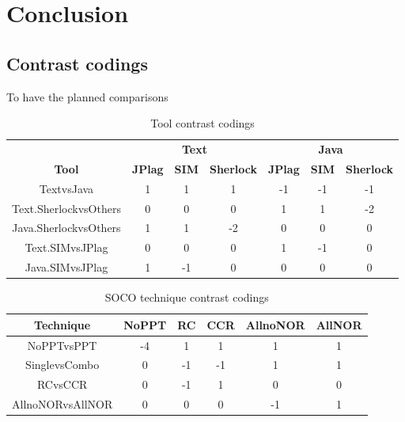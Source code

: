 \documentclass[a4paper, 12pt, oneside, openany, final, pdftex]{book}\usepackage[]{graphicx}\usepackage[]{color}
\begin{document}
\chapter{Conclusion}\label{ch:conclusion}


\begin{appendices}
  \chapter{Contrast codings}\label{apx:contrasts}

  

To have the planned comparisons 

\begin{table}[ht]
  \centering
  \caption{Tool contrast codings}\label{tbl:socoToolContrastsCodings}

\begin{tabular}{ccccccc}
\toprule
\multicolumn{1}{c}{\textbf{ }} & \multicolumn{3}{c}{\textbf{Text}} & \multicolumn{3}{c}{\textbf{Java}} \\
\cmidrule(l{3pt}r{3pt}){2-4} \cmidrule(l{3pt}r{3pt}){5-7}
\multicolumn{1}{c}{\textbf{Tool}} & \multicolumn{1}{c}{\textbf{JPlag}} & \multicolumn{1}{c}{\textbf{SIM}} & \multicolumn{1}{c}{\textbf{Sherlock}} & \multicolumn{1}{c}{\textbf{JPlag}} & \multicolumn{1}{c}{\textbf{SIM}} & \multicolumn{1}{c}{\textbf{Sherlock}}\\
\midrule
\rowcolor{gray!6}  TextvsJava & 1 & 1 & 1 & -1 & -1 & -1\\
Text.SherlockvsOthers & 0 & 0 & 0 & 1 & 1 & -2\\
\rowcolor{gray!6}  Java.SherlockvsOthers & 1 & 1 & -2 & 0 & 0 & 0\\
Text.SIMvsJPlag & 0 & 0 & 0 & 1 & -1 & 0\\
\rowcolor{gray!6}  Java.SIMvsJPlag & 1 & -1 & 0 & 0 & 0 & 0\\
\bottomrule
\end{tabular}


\end{table}

\begin{table}[ht]
  \centering
  \caption{SOCO technique contrast codings}\label{tbl:socotechniqueContrastsCodings}

\begin{tabular}{cccccc}
\toprule
\multicolumn{1}{c}{\textbf{Technique}} & \multicolumn{1}{c}{\textbf{NoPPT}} & \multicolumn{1}{c}{\textbf{RC}} & \multicolumn{1}{c}{\textbf{CCR}} & \multicolumn{1}{c}{\textbf{AllnoNOR}} & \multicolumn{1}{c}{\textbf{AllNOR}}\\
\midrule
\rowcolor{gray!6}  NoPPTvsPPT & -4 & 1 & 1 & 1 & 1\\
SinglevsCombo & 0 & -1 & -1 & 1 & 1\\
\rowcolor{gray!6}  RCvsCCR & 0 & -1 & 1 & 0 & 0\\
AllnoNORvsAllNOR & 0 & 0 & 0 & -1 & 1\\
\bottomrule
\end{tabular}



\end{table}
\end{appendices}
\end{document}
